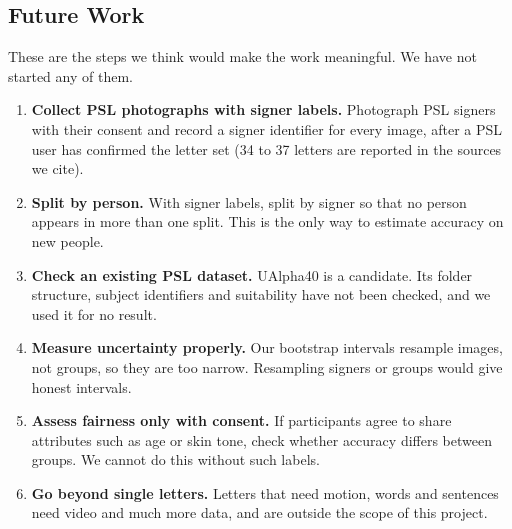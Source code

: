 \subsection{Future Work}

These are the steps we think would make the work meaningful. We have not started any of them.
\begin{enumerate}
  \item \textbf{Collect PSL photographs with signer labels.} Photograph PSL signers with their consent and record a signer identifier for every image, after a PSL user has confirmed the letter set (34 to 37 letters are reported in the sources we cite).
  \item \textbf{Split by person.} With signer labels, split by signer so that no person appears in more than one split. This is the only way to estimate accuracy on new people.
  \item \textbf{Check an existing PSL dataset.} UAlpha40 is a candidate. Its folder structure, subject identifiers and suitability have not been checked, and we used it for no result.
  \item \textbf{Measure uncertainty properly.} Our bootstrap intervals resample images, not groups, so they are too narrow. Resampling signers or groups would give honest intervals.
  \item \textbf{Assess fairness only with consent.} If participants agree to share attributes such as age or skin tone, check whether accuracy differs between groups. We cannot do this without such labels.
  \item \textbf{Go beyond single letters.} Letters that need motion, words and sentences need video and much more data, and are outside the scope of this project.
\end{enumerate}
